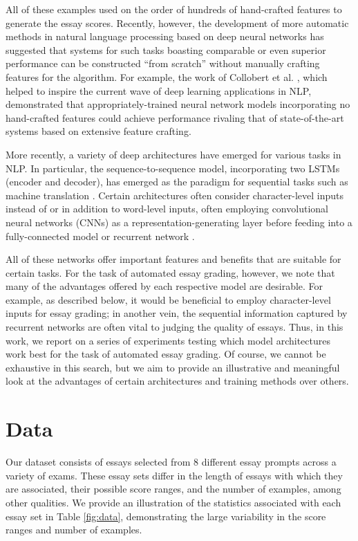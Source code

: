 \documentclass[10pt,psamsfonts]{amsart}
\theoremstyle{definition}
\theoremstyle{remark}
\numberwithin{equation}{section}
\begin{document}
All of these examples used on the order of hundreds of hand-crafted features to generate the essay scores. Recently, however, the development of more automatic methods in natural language processing based on deep neural networks has suggested that systems for such tasks boasting comparable or even superior performance can be constructed ``from scratch'' without manually crafting features for the algorithm. For example, the work of Collobert et al. \cite{collobert}, which helped to inspire the current wave of deep learning applications in NLP, demonstrated that appropriately-trained neural network models incorporating no hand-crafted features could achieve performance rivaling that of state-of-the-art systems based on extensive feature crafting.

More recently, a variety of deep architectures have emerged for various tasks in NLP. In particular, the sequence-to-sequence model, incorporating two LSTMs (encoder and decoder), has emerged as the paradigm for sequential tasks such as machine translation \cite{s2s}. Certain architectures often consider character-level inputs instead of or in addition to word-level inputs, often employing convolutional neural networks (CNNs) as a representation-generating layer before feeding into a fully-connected model or recurrent network \cite{lecun}.

All of these networks offer important features and benefits that are suitable for certain tasks. For the task of automated essay grading, however, we note that many of the advantages offered by each respective model are desirable. For example, as described below, it would be beneficial to employ character-level inputs for essay grading; in another vein, the sequential information captured by recurrent networks are often vital to judging the quality of essays. Thus, in this work, we report on a series of experiments testing which model architectures work best for the task of automated essay grading. Of course, we cannot be exhaustive in this search, but we aim to provide an illustrative and meaningful look at the advantages of certain architectures and training methods over others.

\section*{Data}

Our dataset consists of essays selected from 8 different essay prompts across a variety of exams. These essay sets differ in the length of essays with which they are associated, their possible score ranges, and the number of examples, among other qualities. We provide an illustration of the statistics associated with each essay set in Table \ref{fig:data}, demonstrating the large variability in the score ranges and number of examples.
\end{document}
